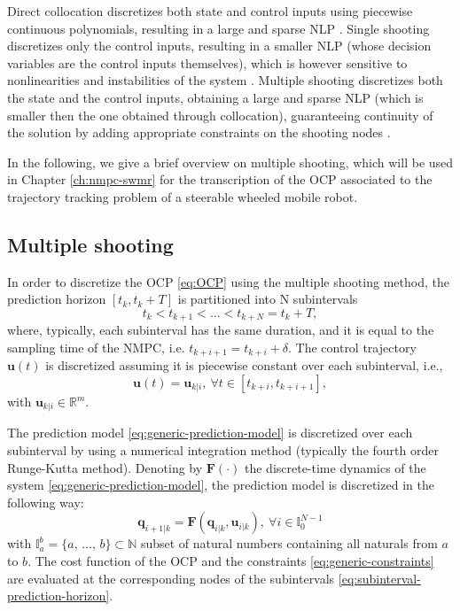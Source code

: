 Direct collocation discretizes both state and
control inputs using 
piecewise continuous polynomials, resulting in a large and sparse NLP
\cite{Hargraves1986Collocation}.
Single shooting discretizes only the control inputs, resulting in a smaller NLP
(whose decision variables are the control inputs themselves), which is however
sensitive to nonlinearities and instabilities of the system
\cite{Zanon2017DirectOptimalControlandMPC}. Multiple shooting discretizes 
both the state and the control inputs, obtaining a large and sparse NLP (which 
is smaller then the one obtained through collocation), guaranteeing continuity
of the solution by adding appropriate constraints on the shooting nodes
\cite{Bock1984MultipleShooting}.

In the following, we give a brief overview on multiple shooting, which will be 
used in Chapter \ref{ch:nmpc-swmr} for the transcription of the OCP associated 
to the trajectory tracking problem of a steerable wheeled mobile robot.

\subsection{Multiple shooting}
In order to discretize the OCP \eqref{eq:OCP} using the multiple shooting method,
the prediction horizon $[t_k, t_k + T]$ is partitioned into N subintervals
\begin{equation}
    \label{eq:subinterval-prediction-horizon}
    t_k < t_{k+1} < \dots < t_{k+N} = t_k + T,
\end{equation}
where, typically, each subinterval has the same duration, and it is equal to 
the sampling time of the NMPC, i.e. $t_{k+i+1}=t_{k+i}+\delta$.
The control trajectory $\bm{u}(t)$ is discretized assuming it is piecewise
constant over each subinterval, i.e.,
\begin{equation*}
    \bm{u}(t) = \bm{u}_{k|i}, \ \forall t \in [t_{k+i}, t_{k+i+1}],
\end{equation*}
with $\bm{u}_{k|i}\in\mathbb{R}^m$.

The prediction model \eqref{eq:generic-prediction-model} is discretized over each 
subinterval by using a numerical integration method
\cite{Butcher2016NumericalMethodsforODE} (typically the fourth order Runge-Kutta
method). Denoting by $\bm{F}(\cdot)$ the discrete-time dynamics of the 
system \eqref{eq:generic-prediction-model}, the prediction model is discretized
in the following way:
\begin{equation*}
    \bm{q}_{i+1|k} = \bm{F}(\bm{q}_{i|k}, \bm{u}_{i|k}), \ \forall i \in \mathbb{I}_{0}^{N-1}
\end{equation*}
with $\mathbb{I}_a^b=\{a,\, \dots,\, b\}\subset\mathbb{N}$ subset
of natural numbers containing all naturals from $a$ to $b$.
The cost function of the OCP and the constraints
\eqref{eq:generic-constraints} are evaluated at the corresponding nodes of the 
subintervals \eqref{eq:subinterval-prediction-horizon}.

